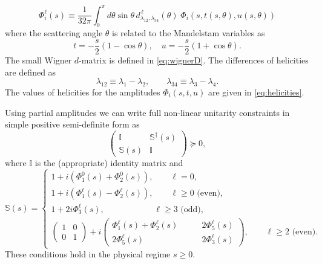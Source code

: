 \begin{equation}
	\label{eq:partial_amplitudes_intro}
	{\Phi_i^{\ell}}(s) \equiv \frac{1}{32\pi}\int_0^\pi d\theta \sin \theta \,d^{\, \ell}_{\lambda_{12}, \lambda_{34}}(\theta)\; \Phi_i\left(s,t(s,\theta),u(s,\theta)\right)
\end{equation}
where the scattering angle $\theta$ is related to the Mandelstam variables as
\begin{equation}
	\label{eq:scattering_angle}
	t = - \frac{s}{2}(1-\cos\theta),\quad
	u = - \frac{s}{2}(1+\cos\theta).
\end{equation}
The small Wigner $d$-matrix is defined in \eqref{eq:wignerD}. The differences of helicities are defined as
\begin{equation}
	\lambda_{12} \equiv \lambda_1 -\lambda_2,\qquad
	\lambda_{34} \equiv \lambda_3 -\lambda_4.
\end{equation}
The values of helicities for the amplitudes $\Phi_i(s,t,u)$ are given in \eqref{eq:helicities}.

Using partial amplitudes we can write full non-linear unitarity constraints in simple positive semi-definite form as
\begin{equation}
	\label{eq:non-linear_unitarity}
\begin{pmatrix}
	\mathbb I & \mathbb S^{ \dagger}(s) \\
	\mathbb S (s) & \mathbb I
\end{pmatrix} \succeq 0,
\end{equation}
where $\mathbb I$ is the (appropriate) identity matrix and 
\begin{equation}
	\label{eq:entriesa_unitarity}
	\mathbb S (s) = \begin{cases}
		1+i(\Phi_1^0(s) + \Phi_2^0(s)),\qquad \ell=0,\\
		1+i(\Phi_1^\ell(s) - \Phi_2^\ell(s)),\qquad\ell \geq 0 \text{ (even)},\\
		1+2i\Phi_3^\ell(s) ,\qquad\qquad\quad\;\;\;\ell \geq 3 \text{ (odd)},\\
		\begin{pmatrix}
			1 & 0\\
			0 & 1
		\end{pmatrix}+
		i\begin{pmatrix}
			\Phi_1^\ell(s) + \Phi_2^\ell(s)  &  \qquad 2 \Phi_5^{\ell}(s) \\
			2 \Phi_5^\ell(s) &    \qquad 2\Phi_3^\ell(s)
		\end{pmatrix}
	,\qquad\ell \geq 2 \text{ (even)}.
	\end{cases}	
\end{equation}
These conditions hold in the physical regime $s\geq 0$.

